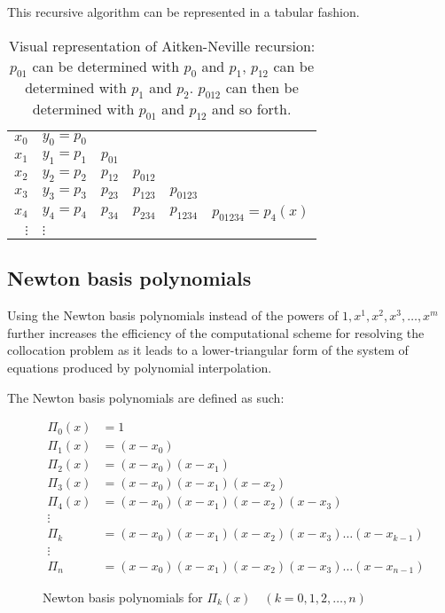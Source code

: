 This recursive algorithm can be represented in a tabular fashion.
\begin{table}[H]
	\centering
	\begin{tabular}{ r | l l l l l }
		$x_0$	& $y_0 = p_0$	&		&		&		& \\
		$x_1$	& $y_1 = p_1$	& $p_{01}$	&		&		& \\
		$x_2$	& $y_2 = p_2$	& $p_{12}$	& $p_{012}$	&		& \\
		$x_3$	& $y_3 = p_3$	& $p_{23}$	& $p_{123}$	& $p_{0123}$	& \\
		$x_4$	& $y_4 = p_4$	& $p_{34}$	& $p_{234}$	& $p_{1234}$	& $p_{01234} = p_4(x)$ \\
		$\vdots$ & $\vdots$	&		&		&		& \\
	\end{tabular}
	\caption{Visual representation of Aitken-Neville recursion: $p_{01}$ can
		be determined with $p_0$ and $p_1$, $p_{12}$ can be determined
		with $p_1$ and $p_2$. $p_{012}$ can then be determined with
		$p_{01}$ and $p_{12}$ and so forth.}
\end{table}


\subsection{Newton basis polynomials}
Using the Newton basis polynomials instead of the powers of $1, x^1, x^2, x^3,
\dots, x^m$ further increases the efficiency of the computational scheme for
resolving the collocation problem as it leads to a lower-triangular form of
the system of equations produced by polynomial interpolation.

The Newton basis polynomials are defined as such:
\begin{figure}[H]
	\centering
	\renewcommand{\figurename}{Equations}
	\begin{align*}
		\Pi_0(x) &= 1 \\
		\Pi_1(x) &= (x - x_0) \\
		\Pi_2(x) &= (x - x_0)(x - x_1) \\
		\Pi_3(x) &= (x - x_0)(x - x_1)(x - x_2) \\
		\Pi_4(x) &= (x - x_0)(x - x_1)(x - x_2)(x - x_3) \\
		\vdots \\
		\Pi_k &= (x - x_0)(x - x_1)(x - x_2)(x - x_3) \dots (x - x_{k-1}) \\
		\vdots \\
		\Pi_n &= (x - x_0)(x - x_1)(x - x_2)(x - x_3) \dots (x - x_{n-1})
	\end{align*}
	\caption{Newton basis polynomials for
		$\Pi_k(x) \quad (k = 0,1,2,\dots,n)$}
\end{figure}


